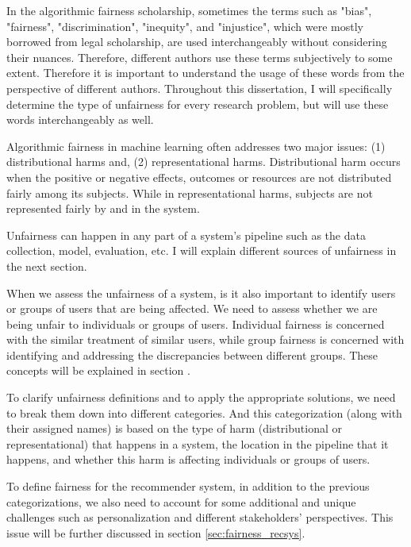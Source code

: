     In the algorithmic fairness scholarship, sometimes the terms such as "bias", "fairness", "discrimination", "inequity", and "injustice", which were mostly borrowed from legal scholarship, are used interchangeably without considering their nuances. Therefore, different authors use these terms subjectively to some extent. Therefore it is important to understand the usage of these words from the perspective of different authors. Throughout this dissertation, I will specifically determine the type of unfairness for every research problem, but will use these words interchangeably as well.
    
    Algorithmic fairness in machine learning often addresses two major issues: (1) distributional harms and, (2) representational harms\cite{crawford2017trouble}. Distributional harm occurs when the positive or negative effects, outcomes or resources are not distributed fairly among its subjects. While in representational harms, subjects are not represented fairly by and in the system. 
    
    Unfairness can happen in any part of a system's pipeline such as the data collection, model, evaluation, etc. I will explain different sources of unfairness in the next section.
    
    When we assess the unfairness of a system, is it also important to identify users or groups of users that are being affected. We need to assess whether we are being unfair to individuals or groups of users. Individual fairness is concerned with the similar treatment of similar users, while group fairness is concerned with identifying and addressing the discrepancies between different groups. These concepts will be explained in section .
    
    To clarify unfairness definitions and to apply the appropriate solutions, we need to break them down into different categories. And this categorization (along with their assigned names) is based on the type of harm (distributional or representational) that happens in a system, the location in the pipeline that it happens, and whether this harm is affecting individuals or groups of users.
    
    To define fairness for the recommender system, in addition to the previous categorizations, we also need to account for some additional and unique challenges such as personalization and different stakeholders' perspectives. This issue will be further discussed in section \ref{sec:fairness_recsys}.

